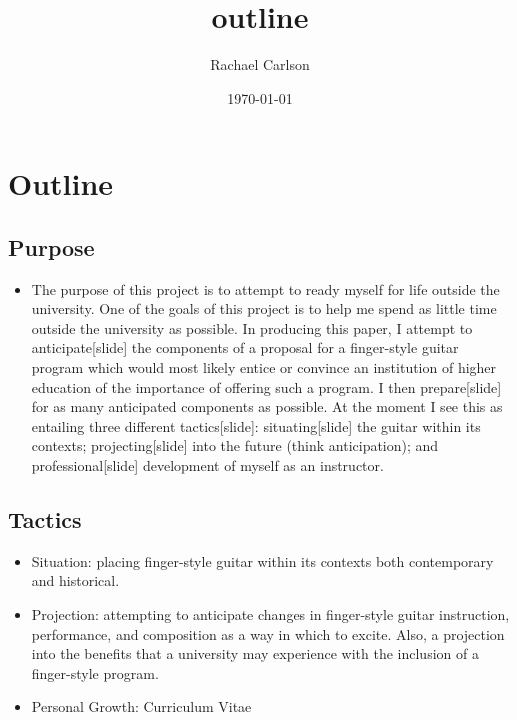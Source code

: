 \documentclass[11pt]{article}
\author{Rachael Carlson}
\date{\today}
\title{outline}
\begin{document}
\maketitle
\tableofcontents

\section{Outline}
\label{sec-1}
\subsection{Purpose}
\label{sec-1-1}
\begin{itemize}
\item The purpose of this project is to attempt to ready myself for life outside
the university. One of the goals of this project is to help me spend as
little time outside the university as possible. In producing this paper, I
attempt to anticipate[slide] the components of a proposal for a
finger-style guitar program which would most likely entice or convince an
institution of higher education of the importance of offering such a
program. I then prepare[slide] for as many anticipated components as
possible. At the moment I see this as entailing three different
tactics[slide]: situating[slide] the guitar within its contexts;
projecting[slide] into the future (think anticipation); and
professional[slide] development of myself as an instructor.
\end{itemize}
\subsection{Tactics}
\label{sec-1-2}
\begin{itemize}
\item Situation: placing finger-style guitar within its contexts both
contemporary and historical.

\item Projection: attempting to anticipate changes in finger-style guitar
instruction, performance, and composition as a way in which to
excite. Also, a projection into the benefits that a university may
experience with the inclusion of a finger-style program.

\item Personal Growth: Curriculum Vitae
\end{itemize}
\end{document}
